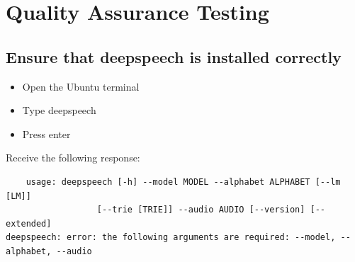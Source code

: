 \documentclass{article}
\begin{document}
\section{Quality Assurance Testing}
\subsection{Ensure that deepspeech is installed correctly}
\begin{itemize}
    \item Open the Ubuntu terminal
    \item Type deepspeech
    \item Press enter
\end{itemize}
Receive the following response:
\begin{verbatim}
    usage: deepspeech [-h] --model MODEL --alphabet ALPHABET [--lm [LM]]
                  [--trie [TRIE]] --audio AUDIO [--version] [--extended]
deepspeech: error: the following arguments are required: --model, --alphabet, --audio
\end{verbatim}
\end{document}
